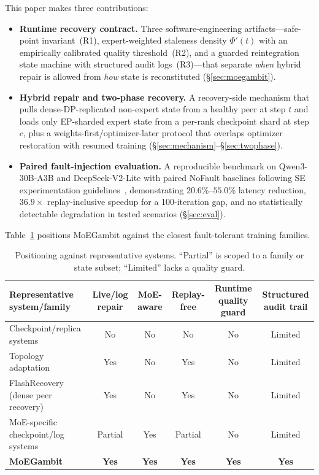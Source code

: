 \documentclass[10pt,conference]{IEEEtran}
\begin{document}
This paper makes three contributions:
\begin{itemize}
    \item \textbf{Runtime recovery contract.} Three software-engineering artifacts---safe-point invariant~(R1), expert-weighted staleness density $\Phi'(t)$ with an empirically calibrated quality threshold~(R2), and a guarded reintegration state machine with structured audit logs~(R3)---that separate \emph{when} hybrid repair is allowed from \emph{how} state is reconstituted (\S\ref{sec:moegambit}).
    \item \textbf{Hybrid repair and two-phase recovery.} A recovery-side mechanism that pulls dense-DP-replicated non-expert state from a healthy peer at step $t$ and loads only EP-sharded expert state from a per-rank checkpoint shard at step $c$, plus a weights-first/optimizer-later protocol that overlaps optimizer restoration with resumed training (\S\ref{sec:mechanism}--\S\ref{sec:twophase}).
    \item \textbf{Paired fault-injection evaluation.} A reproducible benchmark on Qwen3-30B-A3B and DeepSeek-V2-Lite with paired NoFault baselines following SE experimentation guidelines~\cite{wohlin2012ese,arcuri2014hitchhiker}, demonstrating $20.6\%$--$55.0\%$ latency reduction, $36.9\times$ replay-inclusive speedup for a 100-iteration gap, and no statistically detectable degradation in tested scenarios (\S\ref{sec:eval}).
\end{itemize}

Table~\ref{tab:positioning} positions MoEGambit against the closest fault-tolerant training families.

\begin{table}[!t]
\caption{Positioning against representative systems. ``Partial'' is scoped to a family or state subset; ``Limited'' lacks a quality guard.}
\label{tab:positioning}
\setlength{\tabcolsep}{4pt}
\renewcommand{\arraystretch}{1.1}
\begin{center}
\footnotesize
\begin{tabular}{@{}lccccc@{}}
\toprule
\textbf{Representative system/family} & \textbf{Live/log repair} & \textbf{MoE-aware} & \textbf{Replay-free} & \textbf{Runtime quality guard} & \textbf{Structured audit trail} \\
\midrule
Checkpoint/replica systems~\cite{mohan2021checkfreq,nicolae2020deepfreeze,eisenman2022check,wang2023gemini,wang2024reft,wan2024bytecheckpoint} & No & No & No & No & Limited \\
Topology adaptation~\cite{thorpe2023bamboo,jang2023oobleck,gandhi2024recycle} & Yes & No & Yes & No & Limited \\
FlashRecovery (dense peer recovery)~\cite{zhang2025flashrecovery} & Yes & No & Yes & No & Limited \\
MoE-specific checkpoint/log systems~\cite{cai2024moc,gandhi2026moevement} & Partial & Yes & Partial & No & Limited \\
\textbf{MoEGambit} & \textbf{Yes} & \textbf{Yes} & \textbf{Yes} & \textbf{Yes} & \textbf{Yes} \\
\bottomrule
\end{tabular}
\end{center}
\end{table}
\end{document}
